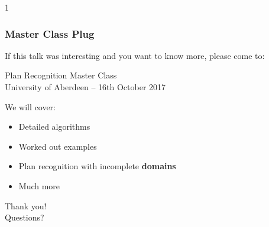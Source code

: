 \documentclass{beamer}
\def\masterclass{1}
\begin{document}
\if\masterclass1
\begin{frame}[c]\frametitle{Master Class Plug}
	If this talk was interesting and you want to know more, please come to:\\[2em]
	\begin{center}
		{\Large
		Plan Recognition Master Class \\[2em] University of Aberdeen -- 16th October 2017
		}
	\end{center}
	We will cover:
	\begin{itemize}
		\item Detailed algorithms
		\item Worked out examples
		\item Plan recognition with incomplete \textbf{domains}
		\item Much more
	\end{itemize}
\end{frame}

\fi



	{
    \begin{frame}{}
    		\centering
    		Thank you!
			\\
			Questions?
    \end{frame}
    }

\end{document}
